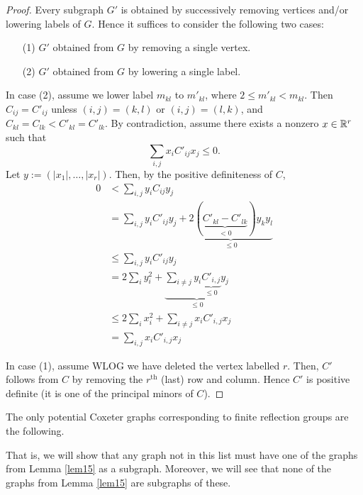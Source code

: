 \begin{proof}
Every subgraph $G'$ is obtained by successively removing vertices and/or
lowering labels of $G$. Hence it suffices to consider the following two cases:
\begin{enumerate}
\item[(1)] $G'$ obtained from $G$ by removing a single vertex.
\item[(2)] $G'$ obtained from $G$ by lowering a single label.
\end{enumerate}

In case (2), assume we lower label $m_{kl}$ to $m'_{kl}$, where
$2 \leq m'_{kl} < m_{kl}$. Then $C_{ij} = C'_{ij}$ unless $(i,j)=(k,l)$ or
$(i,j)=(l,k)$, and $C_{kl} = C_{lk} < C'_{kl} = C'_{lk}$. By contradiction,
assume there exists a nonzero $x \in \mathbb{R}^r$ such that
\[
    \sum_{i,j} x_i C'_{ij} x_j \leq 0.
\]
Let $y := (|x_1|, \dots, |x_r|)$. Then, by the positive definiteness of $C$,
\begin{align*}
    0 &< \sum_{i,j} y_i C_{ij} y_j \\
    &= \sum_{i,j} y_i C'_{ij} y_j +
    \underbrace{2( \underbrace{C'_{kl} - C'_{lk}}_{<0}) y_k y_l}_{\leq 0} \\
    &\leq \sum_{i,j} y_i C'_{ij} y_j \\
    &= 2 \sum_{i} y_i^2 +
    \underbrace{\sum_{i \neq j} y_i \underbrace{C'_{i,j}}_{\leq 0} y_j}_{\leq 0} \\
    &\leq 2 \sum_{i} x_i^2 +
    \sum_{i \neq j} x_i C'_{i,j} x_j \\
    &= \sum_{i,j} x_i C'_{i,j} x_j
\end{align*}

In case (1), assume WLOG we have deleted the vertex labelled $r$. Then,
$C'$ follows from $C$ by removing the $r^{\text{th}}$ (last) row and column.
Hence $C'$ is positive definite (it is one of the principal minors of $C$).
\end{proof}

\begin{proposition} \label{prop17}
The only potential Coxeter graphs corresponding to finite reflection groups are
the following.
\end{proposition}


That is, we will show that any graph not in this list must have one of the
graphs from Lemma \ref{lem15} as a subgraph.
Moreover, we will see that none of the graphs from Lemma \ref{lem15} are
subgraphs of these.

